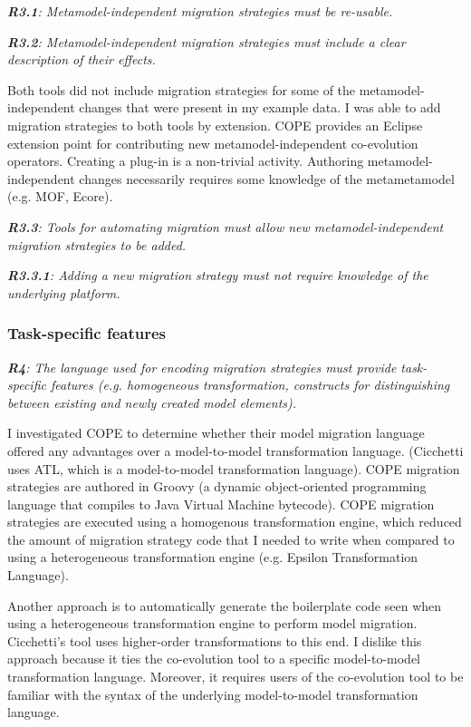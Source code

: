 \documentclass[a4paper]{article}
\begin{document}
\emph{\textbf{R3.1}: Metamodel-independent migration strategies must be re-usable.}

\emph{\textbf{R3.2}: Metamodel-independent migration strategies must include a clear description of their effects.}

Both tools did not include migration strategies for some of the metamodel-independent changes that were present in my example data. I was able to add migration strategies to both tools by extension. COPE provides an Eclipse extension point for contributing new metamodel-independent co-evolution operators. Creating a plug-in is a non-trivial activity. Authoring metamodel-independent changes necessarily requires some knowledge of the metametamodel (e.g. MOF, Ecore).

\emph{\textbf{R3.3}: Tools for automating migration must allow new metamodel-independent migration strategies to be added.}

\emph{\textbf{R3.3.1}: Adding a new migration strategy must not require knowledge of the underlying platform.}


\subsubsection{Task-specific features}

\emph{\textbf{R4}: The language used for encoding migration strategies must provide task-specific features (e.g. homogeneous transformation, constructs for distinguishing between existing and newly created model elements).}

I investigated COPE to determine whether their model migration language offered any advantages over a model-to-model transformation language. (Cicchetti uses ATL, which is a model-to-model transformation language). COPE migration strategies are authored in Groovy (a dynamic object-oriented programming language that compiles to Java Virtual Machine bytecode). COPE migration strategies are executed using a homogenous transformation engine, which reduced the amount of migration strategy code that I needed to write when compared to using a heterogeneous transformation engine (e.g. Epsilon Transformation Language).

Another approach is to automatically generate the boilerplate code seen when using a heterogeneous transformation engine to perform model migration. Cicchetti's tool uses higher-order transformations to this end. I dislike this approach because it ties the co-evolution tool to a specific model-to-model transformation language. Moreover, it requires users of the co-evolution tool to be familiar with the syntax of the underlying model-to-model transformation language.
\end{document}

